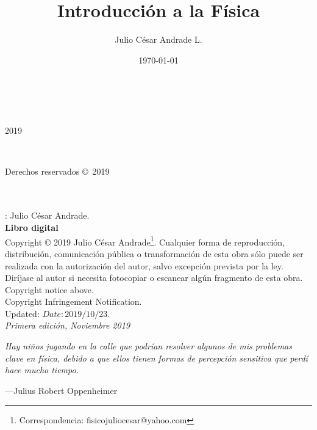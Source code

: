 \documentclass[a5paper,pagesize,10pt,bibtotoc,pointlessnumbers,
normalheadings,DIV=9,fleqn,x11names,table,twoside=false]{scrbook}
\title{Introducción a la Física}
\author{Julio César Andrade L.}
\date{\today}
\begin{document}
%

\BgThispage
\begin{titlepage}
		\\
			
		\vspace{10mm}
		\\
		\vspace{\fill}
		\centering \large{2019}
\end{titlepage}


\newpage
~\vfill
\thispagestyle{empty}
\cleardoublepage

\noindent 
\parbox[s]{0.35\textwidth}{Derechos reservados \copyright\ 2019}\parbox[c]{0.65\textwidth}{
 \color{gray}
 } \\\\  
 
: Julio César Andrade.\\
\noindent \textbf{Libro digital}\\

\noindent  Copyright © 2019 Julio César Andrade\footnote{Correspondencia: fisicojuliocesar@yahoo.com}. 
Cualquier forma de reproducción, distribución, comunicación pública o transformación de esta obra sólo puede ser realizada con  la 
 autorización  del autor,  salvo  excepción  prevista  por  la  ley.  Diríjase  al autor si  necesita  fotocopiar  o  escanear 
algún fragmento de esta obra.\\

Copyright notice above.\\

Copyright Infringement Notification.\\

Updated: $Date: 2019/10/23$.\\

\noindent \textit{Primera edición, Noviembre 2019} 


\newpage{}
\thispagestyle {empty}

\vspace*{2cm}

\begin{center}
	\Large{\parbox{10cm}{
		\begin{raggedright}
		{\Large 
			\textit{Hay niños jugando en la calle que podrían resolver algunos de mis problemas clave en física, 
			debido a que ellos tienen formas de percepción sensitiva que perdí hace mucho tiempo.}
		}
	
		\vspace{.5cm}\hfill{---Julius Robert Oppenheimer}
		\end{raggedright}
	}
}
\end{center}
\end{document}
